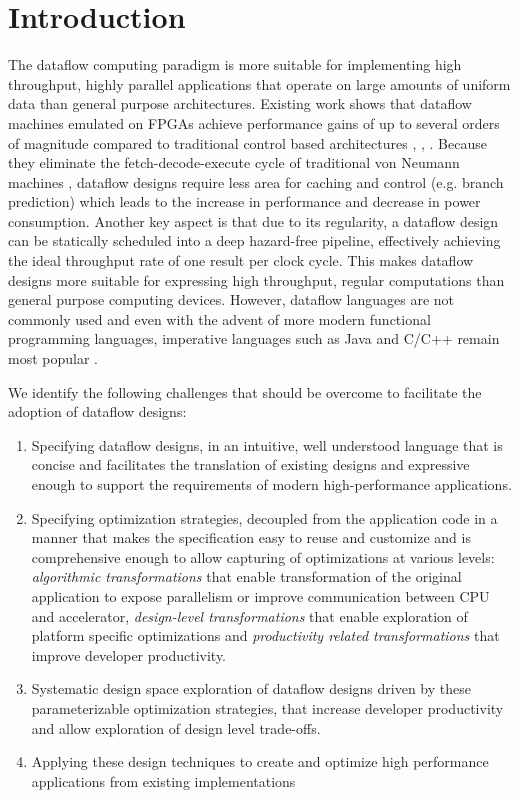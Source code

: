 \section{Introduction}

The dataflow computing paradigm is more suitable for implementing high
throughput, highly parallel applications that operate on large amounts
of uniform data than general purpose architectures. Existing work
shows that dataflow machines emulated on FPGAs achieve performance
gains of up to several orders of magnitude compared to traditional
control based architectures \cite{Flynn:Pell:Mencer:2012},
\cite{Mencer:2012},
\cite{Oriato:Tilbury:Marrocu:Pusceddu:2012}. Because they eliminate
the fetch-decode-execute cycle of traditional von Neumann machines
\cite{Neumann:1993}, dataflow designs require less area for caching
and control (e.g. branch prediction) which leads to the increase in
performance and decrease in power consumption. Another key aspect is
that due to its regularity, a dataflow design can be statically
scheduled into a deep hazard-free pipeline, effectively achieving the
ideal throughput rate of one result per clock cycle. This makes
dataflow designs more suitable for expressing high throughput, regular
computations than general purpose computing devices. However, dataflow
languages are not commonly used and even with the advent of more
modern functional programming languages, imperative languages such as
Java and C/C++ remain most popular \cite{Tiobe:2012}.

We identify the following challenges that should be overcome to
facilitate the adoption of dataflow designs:
\begin{enumerate}
\item Specifying dataflow designs, in an intuitive, well understood
  language that is concise and facilitates the translation of existing
  designs and expressive enough to support the requirements of modern
  high-performance applications.
\item Specifying optimization strategies, decoupled from the
  application code in a manner that makes the specification easy to
  reuse and customize and is comprehensive enough to allow capturing
  of optimizations at various levels: \emph{algorithmic
    transformations} that enable transformation of the original
  application to expose parallelism or improve communication between
  CPU and accelerator, \emph{design-level transformations} that
  enable exploration of platform specific optimizations and
  \emph{productivity related transformations} that improve developer
  productivity.
\item Systematic design space exploration of dataflow designs driven
  by these parameterizable optimization strategies, that increase
  developer productivity and allow exploration of design level
  trade-offs.
\item Applying these design techniques to create and optimize high
  performance applications from existing implementations
\end{enumerate}

